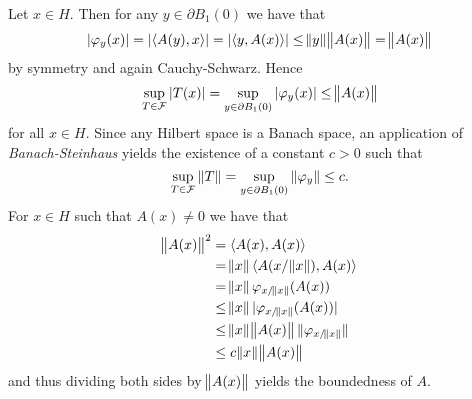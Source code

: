 \begin{enumerate}[label = \textbf{Exercise \arabic*.},wide = 0pt, itemsep = 1.5ex]
		Let $x \in H$. Then for any $y \in \partial B_1(0)$ we have that
		\begin{equation*}
			\abs[0]{\varphi_y(x)} = \abs[0]{\langle A(y),x \rangle} = \abs[0]{\langle y,A(x) \rangle} \leq \norm{y} \norm{A(x)} = \norm{A(x)}
		\end{equation*}
		\noindent by symmetry and again Cauchy-Schwarz. Hence
		\begin{equation*}
			\sup_{T \in \Fcal}\abs[0]{T(x)} = \sup_{y \in \partial B_1(0)} \abs[0]{\varphi_y(x)} \leq \norm{A (x)}
		\end{equation*}
		\noindent for all $x \in H$. Since any Hilbert space is a Banach space, an application of \emph{Banach-Steinhaus} yields the existence of a constant $c > 0$ such that
		\begin{equation*}
			\sup_{T \in \Fcal}\norm[0]{T} = \sup_{y \in \partial B_1(0)} \norm[0]{\varphi_y} \leq c.
		\end{equation*}
		For $x \in H$ such that $A(x) \neq 0$ we have that
		\begin{align*}
			\norm{A(x)}^2 &= \langle A(x),A(x) \rangle\\
			&= \norm{x} \langle A(x / \norm{x}), A(x)\rangle\\
			&= \norm{x} \varphi_{x/\norm{x}}(A(x))\\
			&\leq \norm{x} \abs[0]{\varphi_{x/\norm{x}}(A(x))}\\
			&\leq \norm{x} \norm{A(x)} \norm[0]{\varphi_{x/\norm{x}}}\\
			&\leq c\norm{x} \norm{A(x)}
		\end{align*}
		\noindent and thus dividing both sides by $\norm{A(x)}$ yields the boundedness of $A$.
\end{enumerate}


